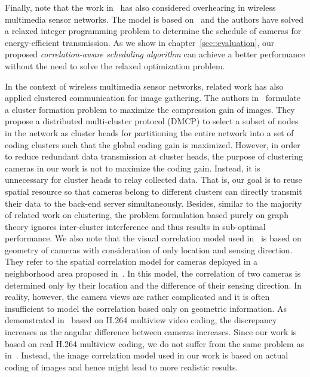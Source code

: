 Finally, note that the work in~\cite{MLS} has also considered overhearing in wireless multimedia sensor networks.
The model is based on~\cite{SpatialCorrelationModel} and the authors have solved a relaxed integer programming problem to determine the schedule of cameras for energy-efficient transmission.
As we show in chapter~\ref{sec::evaluation}, our proposed \emph{correlation-aware scheduling algorithm} can achieve a better performance without the need to solve the relaxed optimization problem.

%
%
%
In the context of wireless multimedia sensor networks, related work has also applied 
clustered communication for image gathering.
The authors in~\cite{DMCPclustering} formulate a cluster formation problem to maximize the compression gain of images.
They propose a distributed multi-cluster protocol (DMCP) to select a subset of nodes in the network as cluster heads for partitioning the entire network into a set of coding clusters such that the global coding gain is maximized.
However, in order to reduce redundant data transmission at cluster heads, the purpose of clustering cameras in our work is not to maximize the coding gain.
Instead, it is unnecessary for cluster heads to relay collected data.
That is, our goal is to reuse spatial resource so that cameras belong to different clusters can directly transmit their data to the back-end server simultaneously.
%
Besides, similar to the majority of related work on clustering, the problem formulation based purely on graph theory ignores inter-cluster interference and thus results in sub-optimal performance.
We also note that the visual correlation model used in~\cite{DMCPclustering,imageModelCluster} is based on geometry of cameras with consideration of only location and sensing direction.
They refer to the spatial correlation model for cameras deployed in a neighborhood area proposed in~\cite{SpatialCorrelationModel}.
In this model, the correlation of two cameras is determined only by their location and the difference of their sensing direction.
In reality, however, the camera views are rather complicated and it is often insufficient to model the correlation based only on geometric information.
As demonstrated in~\cite{RealisticModel} based on H.264 multiview video coding, the discrepancy increases as the angular difference between cameras increases.
Since our work is based on real H.264 multiview coding, we do not suffer from the same problem as in~\cite{DMCPclustering,imageModelCluster}.
Instead, the image correlation model used in our work is based on actual coding of images and hence might lead to more realistic results.

